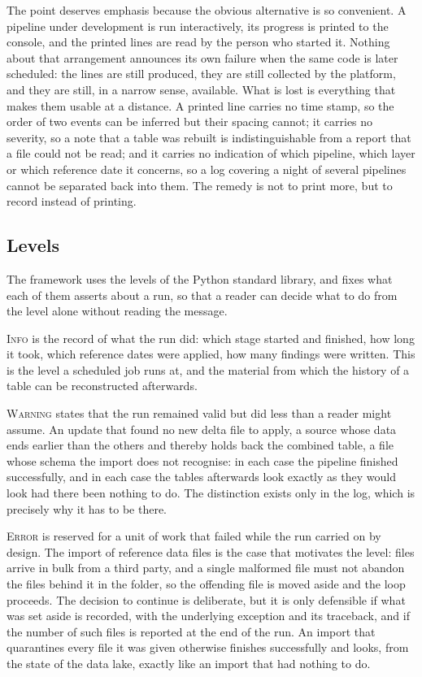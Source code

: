 \documentclass[a4paper, 11pt]{report}
\begin{document}
The point deserves emphasis because the obvious alternative is so convenient. A pipeline under development is run interactively, its progress is printed to the console, and the printed lines are read by the person who started it. Nothing about that arrangement announces its own failure when the same code is later scheduled: the lines are still produced, they are still collected by the platform, and they are still, in a narrow sense, available. What is lost is everything that makes them usable at a distance. A printed line carries no time stamp, so the order of two events can be inferred but their spacing cannot; it carries no severity, so a note that a table was rebuilt is indistinguishable from a report that a file could not be read; and it carries no indication of which pipeline, which layer or which reference date it concerns, so a log covering a night of several pipelines cannot be separated back into them. The remedy is not to print more, but to record instead of printing.

\subsection{Levels}

The framework uses the levels of the Python standard library, and fixes what each of them asserts about a run, so that a reader can decide what to do from the level alone without reading the message.

\textsc{Info} is the record of what the run did: which stage started and finished, how long it took, which reference dates were applied, how many findings were written. This is the level a scheduled job runs at, and the material from which the history of a table can be reconstructed afterwards.

\textsc{Warning} states that the run remained valid but did less than a reader might assume. An update that found no new delta file to apply, a source whose data ends earlier than the others and thereby holds back the combined table, a file whose schema the import does not recognise: in each case the pipeline finished successfully, and in each case the tables afterwards look exactly as they would look had there been nothing to do. The distinction exists only in the log, which is precisely why it has to be there.

\textsc{Error} is reserved for a unit of work that failed while the run carried on by design. The import of reference data files is the case that motivates the level: files arrive in bulk from a third party, and a single malformed file must not abandon the files behind it in the folder, so the offending file is moved aside and the loop proceeds. The decision to continue is deliberate, but it is only defensible if what was set aside is recorded, with the underlying exception and its traceback, and if the number of such files is reported at the end of the run. An import that quarantines every file it was given otherwise finishes successfully and looks, from the state of the data lake, exactly like an import that had nothing to do.
\end{document}
